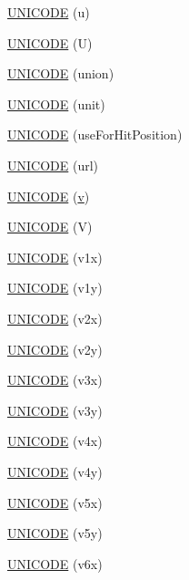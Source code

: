 \begin{DoxyCompactItemize}
\item 
\hyperlink{namespace_d_d4hep_1_1_x_m_l_a59abd1d37fc0ca492051b81ed56cb366}{UNICODE} (u)
\item 
\hyperlink{namespace_d_d4hep_1_1_x_m_l_a20bac6ae34f50451f6fa8d3a370ea837}{UNICODE} (U)
\item 
\hyperlink{namespace_d_d4hep_1_1_x_m_l_a7abb10710f27bbb30f24efe95e9645df}{UNICODE} (union)
\item 
\hyperlink{namespace_d_d4hep_1_1_x_m_l_ab95fce74e56fc43c2f945d306e4324c4}{UNICODE} (unit)
\item 
\hyperlink{namespace_d_d4hep_1_1_x_m_l_a5d336c5ce0a490917ab11d6a0442c8fb}{UNICODE} (useForHitPosition)
\item 
\hyperlink{namespace_d_d4hep_1_1_x_m_l_a29add9e807257ad9eb0af9ebcd8cf77e}{UNICODE} (url)
\item 
\hyperlink{namespace_d_d4hep_1_1_x_m_l_a7071c039a395501190f53ad700ee9772}{UNICODE} (\hyperlink{_multi_view_8cpp_a8320ee13ac034dbf6d624fe8953dd337}{v})
\item 
\hyperlink{namespace_d_d4hep_1_1_x_m_l_a28c05b5730b6137ed7297220a32bf7e7}{UNICODE} (V)
\item 
\hyperlink{namespace_d_d4hep_1_1_x_m_l_a1174c1d663fa1fa811a9de6e4c5001a3}{UNICODE} (v1x)
\item 
\hyperlink{namespace_d_d4hep_1_1_x_m_l_a9e452bbeae8ff0980ac2c44b7cdb4f09}{UNICODE} (v1y)
\item 
\hyperlink{namespace_d_d4hep_1_1_x_m_l_a4b48a3e0629e56ce6baf91a03592a5b1}{UNICODE} (v2x)
\item 
\hyperlink{namespace_d_d4hep_1_1_x_m_l_a84755a77c9650aaff33895b1f2cab0f9}{UNICODE} (v2y)
\item 
\hyperlink{namespace_d_d4hep_1_1_x_m_l_a0e1bad7d65377ee23ab8c88b22fb01bf}{UNICODE} (v3x)
\item 
\hyperlink{namespace_d_d4hep_1_1_x_m_l_abd9f4c902564903eba6126391c0a1986}{UNICODE} (v3y)
\item 
\hyperlink{namespace_d_d4hep_1_1_x_m_l_afcbdc743b050ffb0675386146e79b7ba}{UNICODE} (v4x)
\item 
\hyperlink{namespace_d_d4hep_1_1_x_m_l_a98ccfeb89844ea2f907ec7bc7c409e08}{UNICODE} (v4y)
\item 
\hyperlink{namespace_d_d4hep_1_1_x_m_l_a47e3e609dcc3aa6110c5b388a29f35b6}{UNICODE} (v5x)
\item 
\hyperlink{namespace_d_d4hep_1_1_x_m_l_a4525d780b4b1052f72d2906cc27f77f6}{UNICODE} (v5y)
\item 
\hyperlink{namespace_d_d4hep_1_1_x_m_l_ada7ef7e78e23bcbf08a5f918d03e73cd}{UNICODE} (v6x)

\end{DoxyCompactItemize}
